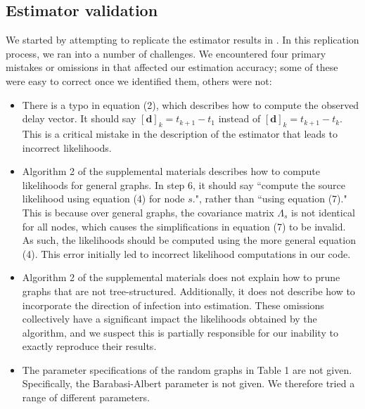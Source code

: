 \subsection{Estimator validation}
We started by attempting to replicate the estimator results in \cite{pinto}. 
In this replication process, we ran into a number of challenges. We encountered four primary mistakes or omissions in \cite{pinto} that affected our estimation accuracy; some of these were easy to correct once we identified them, others were not:
\begin{itemize}
\item There is a typo in equation (2), which describes how to compute the observed delay vector. It should say $[\boldsymbol d]_k=t_{k+1}-t_1$ instead of $[\boldsymbol d]_k=t_{k+1}-t_k$. This is a critical mistake in the description of the estimator that leads to incorrect likelihoods. 
\item Algorithm 2 of the supplemental materials describes how to compute likelihoods for general graphs. In step 6, it should say ``compute the source likelihood using equation (4) for node $s$.", rather than ``using equation (7)." This is because over general graphs, the covariance matrix $\Lambda_s$ is not identical for all nodes, which causes the simplifications in equation (7) to be invalid. As such, the likelihoods should be computed using the more general equation (4). This error initially led to incorrect likelihood computations in our code.
\item Algorithm 2 of the supplemental materials does not explain how to prune graphs that are not tree-structured. Additionally, it does not describe how to incorporate the direction of infection into estimation. These omissions collectively have a significant impact the likelihoods obtained by the algorithm, and we suspect this is partially responsible for our inability to exactly reproduce their results.
\item The parameter specifications of the random graphs in Table 1 are not given. Specifically, the Barabasi-Albert parameter is not given. We therefore tried a range of different parameters.
\end{itemize}

